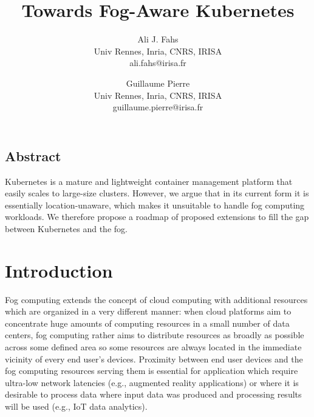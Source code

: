 \documentclass[letterpaper,twocolumn,10pt]{article}
\begin{document}
\date{}
\title{\Large \bf Towards Fog-Aware Kubernetes}
\author{
{\rm Ali J. Fahs}\\
Univ Rennes, Inria, CNRS, IRISA\\
ali.fahs@irisa.fr
\and
{\rm Guillaume Pierre}\\
Univ Rennes, Inria, CNRS, IRISA\\
guillaume.pierre@irisa.fr
}
\maketitle
\thispagestyle{empty}


\subsection*{Abstract}

Kubernetes is a mature and lightweight container management platform
that easily scales to large-size clusters. However, we argue that in
its current form it is essentially location-unaware, which makes it
unsuitable to handle fog computing workloads. We therefore propose a
roadmap of proposed extensions to fill the gap between Kubernetes and
the fog.

\section{Introduction}

Fog computing extends the concept of cloud computing with additional
resources which are organized in a very different manner: when cloud
platforms aim to concentrate huge amounts of computing resources in a
small number of data centers, fog computing rather aims to distribute
resources as broadly as possible across some defined area so some
resources are always located in the immediate vicinity of every end
user's devices. Proximity between end user devices and the fog
computing resources serving them is essential for application which
require ultra-low network latencies (e.g., augmented reality
applications) or where it is desirable to process data where input
data was produced and processing results will be used (e.g., IoT data
analytics).


\end{document}

